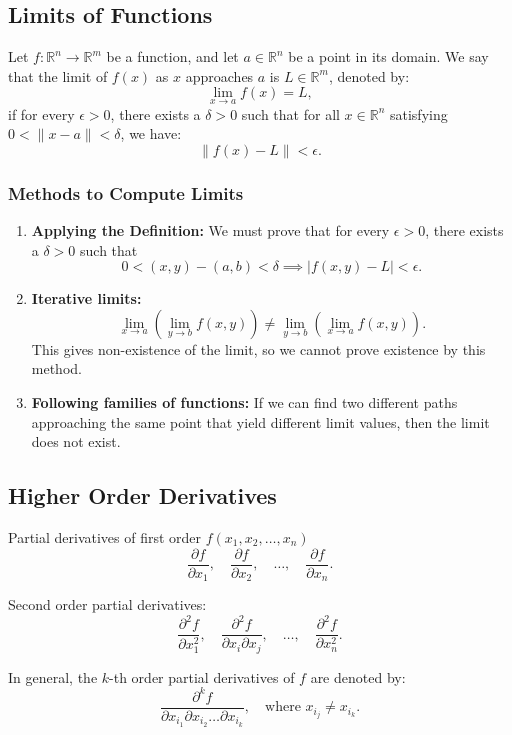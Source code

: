 \documentclass[11pt]{article}
\begin{document}
\pagebreak

\subsection{Limits of Functions}
Let $f : \mathbb{R}^n \to \mathbb{R}^m$ be a function, and let $a \in \mathbb{R}^n$ be a point in its domain. We say that the limit of $f(x)$ as $x$ approaches $a$ is $L \in \mathbb{R}^m$, denoted by:
\[ \lim_{x \to a} f(x) = L, \]
if for every $\epsilon > 0$, there exists a $\delta > 0$ such that for all $x \in \mathbb{R}^n$ satisfying $0 < \|x - a\| < \delta$, we have:
\[ \|f(x) - L\| < \epsilon. \]

\subsubsection{Methods to Compute Limits}
\begin{enumerate}
    \item \textbf{Applying the Definition:} We must prove that for every $\epsilon > 0$, there exists a $\delta > 0$ such that 
        \[ 0 < (x, y) - (a, b) < \delta \implies |f(x, y) - L| < \epsilon. \]
    \item \textbf{Iterative limits:} 
        \[\lim_{x \to a} \left( \lim_{y \to b} f(x, y) \right) \neq \lim_{y \to b} \left( \lim_{x \to a} f(x, y) \right).\]
        This gives non-existence of the limit, so we cannot prove existence by this method.
    \item \textbf{Following families of functions:} If we can find two different paths approaching the same point that yield different limit values, then the limit does not exist.
\end{enumerate}

\subsection{Higher Order Derivatives}
Partial derivatives of first order \(f(x_1, x_2, \dots, x_n)\)
\[
\frac{\partial f}{\partial x_1}, \quad \frac{\partial f}{\partial x_2}, \quad \dots, \quad \frac{\partial f}{\partial x_n}.
\]

Second order partial derivatives:
\[
\frac{\partial^2 f}{\partial x_1^2}, \quad \frac{\partial^2 f}{\partial x_i \partial x_j}, \quad \dots, \quad \frac{\partial^2 f}{\partial x_n^2}.
\]

In general, the \(k\)-th order partial derivatives of \(f\) are denoted by:
\[
\frac{\partial^k f}{\partial x_{i_1} \partial x_{i_2} \dots \partial x_{i_k}},\quad \text{where \(x_{i_j} \neq x_{i_k}\)}.
\]
\end{document}
